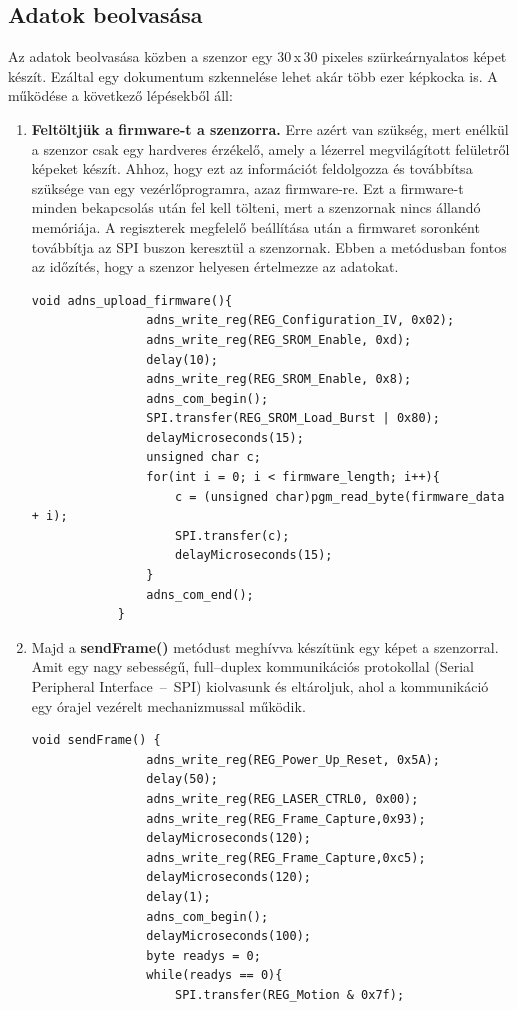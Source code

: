\documentclass[]{thesis-ekf}
\theoremstyle{definition}
\theoremstyle{remark}
\begin{document}
	\subsection{Adatok beolvasása}
	Az adatok beolvasása közben a szenzor egy 30\,x\,30 pixeles szürkeárnyalatos képet készít. Ezáltal egy dokumentum szkennelése lehet akár több ezer képkocka is.\cite{adns9800_code}
	A működése a következő lépésekből áll:
	\begin{enumerate}
		\item \textbf{Feltöltjük a firmware-t a szenzorra.} Erre azért van szükség, mert enélkül a szenzor csak egy hardveres érzékelő, amely a lézerrel megvilágított felületről képeket készít. Ahhoz, hogy ezt az információt feldolgozza és továbbítsa szüksége van egy vezérlőprogramra, azaz firmware-re. Ezt a firmware-t minden bekapcsolás után fel kell tölteni, mert a szenzornak nincs állandó memóriája. A regiszterek megfelelő beállítása után a firmwaret soronként továbbítja  az SPI buszon keresztül a szenzornak. Ebben a metódusban fontos az időzítés, hogy a szenzor helyesen értelmezze az adatokat. \cite{arduino_latex}
		\begin{lstlisting}[language=Arduino,label=upload-firmware-code]
			void adns_upload_firmware(){
				adns_write_reg(REG_Configuration_IV, 0x02);	
				adns_write_reg(REG_SROM_Enable, 0xd); 
				delay(10); 
				adns_write_reg(REG_SROM_Enable, 0x8); 
				adns_com_begin();
				SPI.transfer(REG_SROM_Load_Burst | 0x80); 
				delayMicroseconds(15);
				unsigned char c;
				for(int i = 0; i < firmware_length; i++){ 
					c = (unsigned char)pgm_read_byte(firmware_data + i);
					SPI.transfer(c);
					delayMicroseconds(15); 
				}
				adns_com_end();
			}
		\end{lstlisting}
		\item Majd a \textbf{sendFrame()} metódust meghívva készítünk egy képet a szenzorral. Amit egy nagy sebességű, full--duplex kommunikációs protokollal (Serial Peripheral Interface~--~SPI)\cite{serial} kiolvasunk és eltároljuk, ahol a kommunikáció egy órajel vezérelt mechanizmussal működik. 
		\begin{lstlisting}[language=Arduino,label=sendFrame]
			void sendFrame() {
				adns_write_reg(REG_Power_Up_Reset, 0x5A);
				delay(50);
				adns_write_reg(REG_LASER_CTRL0, 0x00);
				adns_write_reg(REG_Frame_Capture,0x93);
				delayMicroseconds(120); 
				adns_write_reg(REG_Frame_Capture,0xc5);
				delayMicroseconds(120); 
				delay(1); 
				adns_com_begin(); 
				delayMicroseconds(100); 
				byte readys = 0;
				while(readys == 0){
					SPI.transfer(REG_Motion & 0x7f);

\end{lstlisting}
\end{enumerate}
\end{document}
